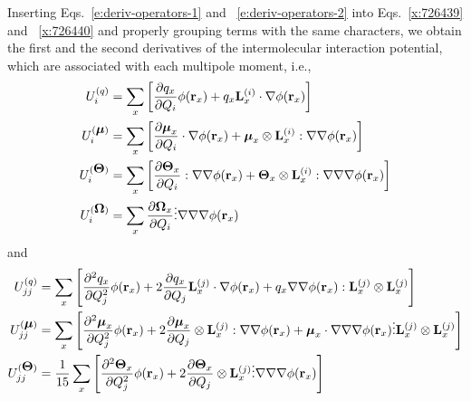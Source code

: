 \documentclass[a4paper,titlepage,twoside,fleqn,12pt]{book}
\newcommand{\BM}[1]{\ensuremath{\mbox{\boldmath${#1}$}}}
\newcommand{\fderiv}[2]{\ensuremath{
\frac{\partial #1}{\partial #2}}}
\newcommand{\sderiv}[2]{\ensuremath{
\frac{\partial^2 #1}{\partial #2^2}
}}
\begin{document}
\begin{refsection}
Inserting Eqs.~\eqref{e:deriv-operators-1} and ~\eqref{e:deriv-operators-2}
into Eqs.~\eqref{x:726439} and ~\eqref{x:726440} and properly 
grouping terms with the same characters, we obtain
the first and the second derivatives of the intermolecular interaction
potential, which are associated with each multipole moment, i.e.,
%
\begin{subequations}  \label{e:f-terms}
\begin{align}
 U_i^{(q)}          &= \sum_x 
  \left[ \fderiv{q_x}{Q_i} \phi({\bf r}_x) 
 + q_x {\bf L}_x^{(i)} \cdot \nabla \phi({\bf r}_x) \right]       
                                                                \label{e:f-terms-1} \\
 U_i^{(\BM\mu)}     &= \sum_x  
  \left[ \fderiv{{\BM \mu}_x}{Q_i} \cdot \nabla\phi({\bf r}_x) 
 + {\BM \mu}_x \otimes {\bf L}_x^{(i)} : \nabla\nabla \phi({\bf r}_x) \right]     
                                                                \label{e:f-terms-2} \\
 U_i^{(\BM\Theta)}  &= \sum_x  
  \left[ \fderiv{{\BM \Theta}_x}{Q_i} : \nabla\nabla\phi({\bf r}_x) 
 + {\BM \Theta}_x \otimes {\bf L}_x^{(i)} : \nabla\nabla\nabla \phi({\bf r}_x) \right]      
                                                                \label{e:f-terms-3} \\
 U_i^{(\BM\Omega)}  &= \sum_x      
  \fderiv{{\BM \Omega}_x}{Q_i} \vdots \nabla\nabla\nabla\phi({\bf r}_x)  
                                                                \label{e:f-terms-4} 
\end{align}
\end{subequations}
%
and
%
\begin{subequations}  \label{e:k-terms}
\begin{align}
 U_{jj}^{(q)}          &= \sum_x   
    \left[ \sderiv{q_x}{Q_j} \phi({\bf r}_x) 
    + 2 \fderiv{q_x}{Q_j} {\bf L}_x^{(j)} \cdot \nabla \phi({\bf r}_x) 
    + q_x \nabla\nabla \phi({\bf r}_x) : {\bf L}_x^{(j)} \otimes {\bf L}_x^{(j)} \right]     \label{e:k-terms-1} \\
%
 U_{jj}^{(\BM\mu)}     &= \sum_x  
    \left[ \sderiv{{\BM \mu}_x}{Q_j} \phi({\bf r}_x) 
    + 2 \fderiv{{\BM \mu}_x}{Q_j} \otimes {\bf L}_x^{(j)} : \nabla\nabla \phi({\bf r}_x) 
    + {\BM \mu}_x \cdot \nabla\nabla\nabla \phi({\bf r}_x) \vdots {\bf L}_x^{(j)} \otimes {\bf L}_x^{(j)} \right]      
    \label{e:k-terms-2} \\
%
 U_{jj}^{(\BM\Theta)}  &= \frac{1}{15} \sum_x  
    \left[ \sderiv{{\BM \Theta}_x}{Q_j} \phi({\bf r}_x) 
    + 2 \fderiv{{\BM \Theta}_x}{Q_j} \otimes {\bf L}_x^{(j)} \vdots \nabla\nabla\nabla \phi({\bf r}_x)  \right]      

\end{align}
\end{subequations}
\end{refsection}
\end{document}
